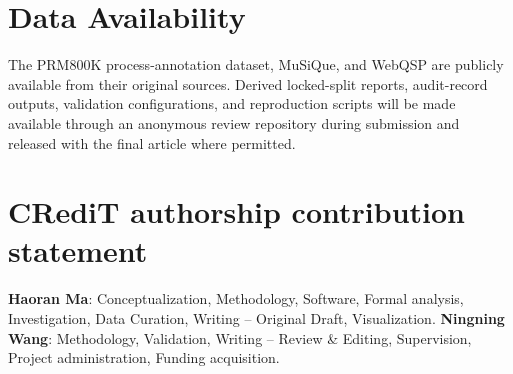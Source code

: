 \documentclass[pdflatex,sn-mathphys-num,iicol]{sn-jnl}
\begin{document}
\section*{Data Availability}
The PRM800K process-annotation dataset, MuSiQue, and WebQSP are publicly available from their original sources. Derived locked-split reports, audit-record outputs, validation configurations, and reproduction scripts will be made available through an anonymous review repository during submission and released with the final article where permitted.

\section*{CRediT authorship contribution statement}
\textbf{Haoran Ma}: Conceptualization, Methodology, Software, Formal analysis, Investigation, Data Curation, Writing -- Original Draft, Visualization. \textbf{Ningning Wang}: Methodology, Validation, Writing -- Review \& Editing, Supervision, Project administration, Funding acquisition.

\clearpage


\end{document}
